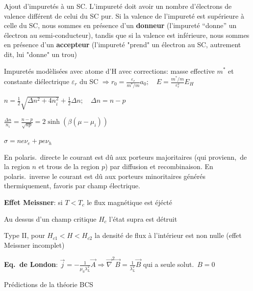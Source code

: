 Ajout d’impuretés à un SC.
L’impureté doit avoir un nombre d’électrons de valence diﬀérent de celui du SC pur. Si la valence de l’impureté est supérieure à celle du SC, nous sommes en présence d’un \textbf{donneur} (l’impureté “donne” un électron au semi-conducteur), tandis que si la valence est inférieure, nous sommes en présence d’un \textbf{accepteur} (l’impureté "prend" un électron au SC, autrement dit, lui "donne" un trou)
\begin{squishlist}
    \item Impuretés modèlisées avec atome d'H avec corrections: masse effective $m^*$ et constante diélectrique $\varepsilon_r$ du SC 
    $\Longrightarrow r_0 = \frac{\varepsilon_r}{m^*/m} a_0; \quad E=\frac{m^*/m}{\varepsilon_r^2}E_H$
    \item $n = \frac{1}{2}\sqrt{\Delta n^2 + 4 n_i^2} + \frac{1}{2}\Delta n;\quad \Delta n = n - p$
    \item $\frac{\Delta n }{n_i} = \frac{n-p}{\sqrt{np}} = 2 \sinh (\beta(\mu - \mu_i))$
    \item $\sigma = n e \nu_e + p e \nu_h$
\end{squishlist}    

En polaris.\ directe le courant est dû aux porteurs majoritaires (\elec qui provienn,\ de la region $n$ et trous de la region $p$) par diffusion et recombinaison.
En polaris.\ inverse le courant est dû aux porteurs minoritaires générés thermiquement, favoris par champ électrique.

\begin{squishlist}
    \item \textbf{Effet Meissner}: si $T<T_c$ le flux magnétique est éjécté
    \item Au dessus d'un champ critique $H_c$ l'état supra est détruit
    \item Type II, pour $H_{c1}<H<H_{c2}$ la densité de flux à l'intérieur est non nulle (effet Meissner incomplet)
    \item \textbf{Eq.\ de London}: $\vec{j} = - \frac{1}{\mu_0 \lambda_L^2} \vec{A} \Longrightarrow \vec{\nabla}^2 \vec{B} = \frac{1}{\lambda_L^2}\vec{B}$ qui a seule solut.\ $B=0$
    \item Prédictions de la théorie BCS
\end{squishlist}